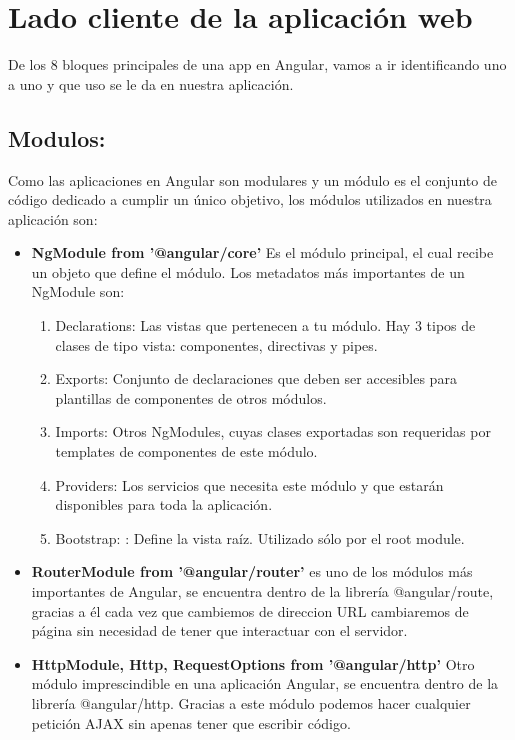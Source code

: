 \section{Lado cliente de la aplicación web}

De los 8 bloques principales de una app en Angular, vamos a ir identificando uno a uno y que uso se le da en nuestra aplicación.

\subsection{Modulos: } Como las aplicaciones en Angular son modulares y un módulo es el conjunto de código dedicado a cumplir un único objetivo, los módulos utilizados en nuestra aplicación son:
\begin{itemize}
\item \textbf{NgModule from '@angular/core'} Es el módulo principal, el cual recibe un objeto que define el módulo. Los metadatos más importantes de un NgModule son:

\begin{enumerate}
\item{Declarations: } Las vistas que pertenecen a tu módulo. Hay 3 tipos de clases de tipo vista: componentes, directivas y pipes.
\item{Exports: } Conjunto de declaraciones que deben ser accesibles para plantillas de componentes de otros módulos.

\item{Imports: } Otros NgModules, cuyas clases exportadas son requeridas por templates de componentes de este módulo.

\item{Providers: } Los servicios que necesita este módulo y que estarán disponibles para toda la aplicación.

\item{Bootstrap: }: Define la vista raíz. Utilizado sólo por el root module.
\end{enumerate}

\item \textbf{RouterModule from '@angular/router'} es uno de los módulos más importantes de Angular, se encuentra dentro de la librería @angular/route, gracias a él cada vez que cambiemos de direccion URL cambiaremos de página sin necesidad de tener que interactuar con el servidor.

\item \textbf{ HttpModule, Http, RequestOptions from '@angular/http'} Otro módulo imprescindible en una aplicación Angular, se encuentra dentro de la librería @angular/http. Gracias a este módulo podemos hacer cualquier petición AJAX sin apenas tener que escribir código.


\end{itemize}
